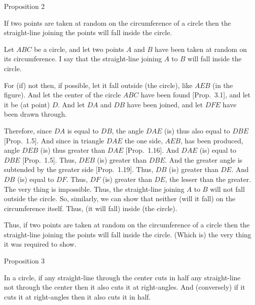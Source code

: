 
\begin{center}
{\large Proposition 2}
\end{center}

If two points are taken at random on the circumference of a circle then
the straight-line joining the points will fall inside the circle.

Let $ABC$ be a circle, and let two points $A$ and $B$ have been taken
at random on its circumference. I say that the straight-line joining
$A$ to $B$ will fall inside the circle.

For (if) not then, if possible, let it fall outside (the circle), like $AEB$ (in the figure). And let the center of the circle $ABC$ have been found [Prop.~3.1], and let it be (at point) $D$. And let $DA$ and $DB$ have been joined, and let $DFE$ have been
drawn through.

Therefore, since $DA$ is equal to $DB$, the angle $DAE$ (is) thus also equal to
$DBE$ [Prop.~1.5]. And since in triangle $DAE$ the one side, $AEB$, has been
produced, angle $DEB$ (is) thus greater than $DAE$ [Prop.~1.16]. And
$DAE$ (is) equal to $DBE$ [Prop.~1.5]. Thus, $DEB$ (is) greater than $DBE$.
And the greater angle is subtended by the greater side [Prop.~1.19].
Thus, $DB$ (is) greater than $DE$. And $DB$ (is) equal to $DF$. Thus,
$DF$ (is) greater than $DE$, the lesser than the greater. The very thing is impossible.
Thus, the straight-line joining $A$ to $B$ will not fall outside the
circle. So, similarly, we can show that neither (will it fall) on the
circumference itself. Thus, (it will fall) inside (the circle).

\epsfysize=2.2in
\centerline{}

Thus, if two points are taken at random on the circumference of a circle then
the straight-line joining the points will fall inside the circle. (Which is) the
very thing it was required to show.


\begin{center}
{\large Proposition 3}
\end{center}

In a circle, if any straight-line through the center cuts in half any straight-line
not through the center then it also cuts it at right-angles. And (conversely)
if it cuts it at right-angles then it also cuts it in half.

